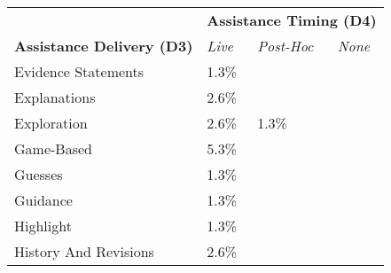 \begin{tabular}{p{3.5cm}p{2cm}p{2cm}p{2cm}}
\toprule 
& \multicolumn{3}{c}{\textbf{\textcolor{color3}{Assistance Timing (D4)}}} \\ \cmidrule{2-4} \textbf{\textcolor{color3}{Assistance Delivery (D3)}} & \textit{Live} & \textit{Post-Hoc} & \textit{None}\\ 
\midrule
\noalign{\smallskip}

Evidence Statements & 1.3\% \newline \cite{10.1145/3301275.3302265} \cellcolor[cmyk]{0.004262162162162162,0.0,0.001008108108108108,0.0014837837837837836} &  &  \\ 
Explanations & 2.6\% \newline \cite{10.1145/3462462.3468882, 10.4018/IJSWIS.340727} \cellcolor[cmyk]{0.008524324324324324,0.0,0.002016216216216216,0.002967567567567567} &  &  \\ 
Exploration & 2.6\% \newline \cite{10.1145/3025171.3025172, 10.1145/3430524.3440638} \cellcolor[cmyk]{0.008524324324324324,0.0,0.002016216216216216,0.002967567567567567} & 1.3\% \newline \cite{10.1145/2858036.2858529} \cellcolor[cmyk]{0.004262162162162162,0.0,0.001008108108108108,0.0014837837837837836} &  \\ 
Game-Based & 5.3\% \newline \cite{10.1007/978-3-031-05028-2_29, 10.1145/3491101.3516487, 10.1145/3459990.3465176, 10.1145/3585088.3593884} \cellcolor[cmyk]{0.017048648648648648,0.0,0.004032432432432432,0.005935135135135134} &  &  \\ 
Guesses & 1.3\% \newline \cite{10.1145/3301275.3302265} \cellcolor[cmyk]{0.004262162162162162,0.0,0.001008108108108108,0.0014837837837837836} &  &  \\ 
Guidance & 1.3\% \newline \cite{10.5555/1620113.1620118} \cellcolor[cmyk]{0.004262162162162162,0.0,0.001008108108108108,0.0014837837837837836} &  &  \\ 
Highlight & 1.3\% \newline \cite{10.1145/3301275.3302265} \cellcolor[cmyk]{0.004262162162162162,0.0,0.001008108108108108,0.0014837837837837836} &  &  \\ 
History And Revisions & 2.6\% \newline \cite{10.1145/3313831.3376764, 10.1145/3530800.3534539} \cellcolor[cmyk]{0.008524324324324324,0.0,0.002016216216216216,0.002967567567567567} &  &  \\ 

\end{tabular}
